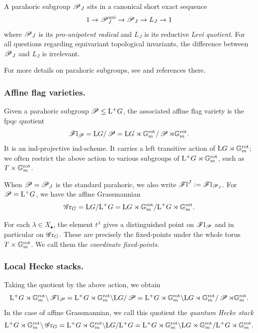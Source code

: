 A parahoric subgroup $\operatorname{\mathscr{P}}_{J}$ sits in a canonical short exact sequence
\begin{equation*}
1 \to \operatorname{\mathscr{P}}_{J}^{\mathrm{uni}} \to \operatorname{\mathscr{P}}_{J} \to L_{J} \to 1    
\end{equation*}
where $\operatorname{\mathscr{P}}_{J}$ is its \textit{pro-unipotent radical} and $L_{J}$ is its reductive \textit{Levi quotient}. 
For all questions regarding equivariant topological invariants, the difference between $\operatorname{\mathscr{P}}_{J}$ and $L_{J}$ is irrelevant.

For more details on parahoric subgroups, see \cite[\S 2.1.5]{Yun15} and references there.

\subsubsection{Affine flag varieties.}
Given a parahoric subgroup $\operatorname{\mathscr{P}} \leq \mathrm{L^+} G$, the associated affine flag variety is the fpqc quotient
\begin{equation*}
    \operatorname{\mathscr{F}l}_{\operatorname{\mathscr{P}}} = \mathrm{L} G / \operatorname{\mathscr{P}} = \mathrm{L} G \rtimes \mathbb{G}_m^{\mathrm{rot}} / \operatorname{\mathscr{P}} \rtimes \mathbb{G}_m^{\mathrm{rot}}.
\end{equation*}
It is an ind-projective ind-scheme. It carries a left transitive action of $\mathrm{L} G \rtimes \mathbb{G}_m^{\mathrm{rot}}$; we often restrict the above action to various subgroups of $\mathrm{L^+} G \rtimes \mathbb{G}_m^{\mathrm{rot}}$, such as $T \times \mathbb{G}_m^{\mathrm{rot}}$.

When $\operatorname{\mathscr{P}}= \operatorname{\mathscr{P}}_J$ is the standard parahoric, we also write $\operatorname{\mathscr{F}l}^J := \operatorname{\mathscr{F}l}_{\operatorname{\mathscr{P}}_J}$.
For $\operatorname{\mathscr{P}} = \mathrm{L^+} G$, we have the affine Grassmannian
\begin{equation*}
    \operatorname{\mathscr{G}r}_{G} = \mathrm{L} G / \mathrm{L^+} G = \mathrm{L} G \rtimes \mathbb{G}_m^{\mathrm{rot}} / \mathrm{L^+} G \rtimes \mathbb{G}_m^{\mathrm{rot}}.
\end{equation*}

For each $\lambda \in X_{\bullet}$, the element $t^{\lambda}$ gives a distinguished point on $\operatorname{\mathscr{F}l}_{\operatorname{\mathscr{P}}}$ and in particular on $\operatorname{\mathscr{G}r}_G$. These are precisely the fixed-points under the whole torus $T \times \mathbb{G}_m^{\mathrm{rot}}$. We call them the \emph{coordinate fixed-points}.


\subsubsection{Local Hecke stacks.}\label{section: local quantum hecke stacks}
Taking the quotient by the above action, we obtain
\begin{equation*}
   \mathrm{L^+} G \rtimes \mathbb{G}_m^{\mathrm{rot}} \backslash \operatorname{\mathscr{F}l}_{\operatorname{\mathscr{P}}} = \mathrm{L^+} G \rtimes \mathbb{G}_m^{\mathrm{rot}} \backslash \mathrm{L} G / \operatorname{\mathscr{P}} = \mathrm{L^+} G \rtimes \mathbb{G}_m^{\mathrm{rot}} \backslash \mathrm{L} G \rtimes \mathbb{G}_m^{\mathrm{rot}} / \operatorname{\mathscr{P}} \rtimes \mathbb{G}_m^{\mathrm{rot}}.
\end{equation*}
In the case of affine Grassmannian, we call this quotient the \emph{quantum Hecke stack}
\begin{equation*}
   \mathrm{L^+} G \rtimes \mathbb{G}_m^{\mathrm{rot}} \backslash \operatorname{\mathscr{G}r}_{G} = \mathrm{L^+} G \rtimes \mathbb{G}_m^{\mathrm{rot}} \backslash \mathrm{L} G / \mathrm{L^+} G = \mathrm{L^+} G \rtimes \mathbb{G}_m^{\mathrm{rot}} \backslash \mathrm{L} G \rtimes \mathbb{G}_m^{\mathrm{rot}} / \mathrm{L^+} G \rtimes \mathbb{G}_m^{\mathrm{rot}}.
\end{equation*}



